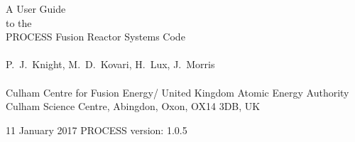 \documentclass[11pt,a4paper]{report}
\newcommand{\version}{
11 January 2017
\hfill
PROCESS version: 1.0.5
}
\begin{document}
\footnotesize
\hfill

\vspace*{4cm}
\begin{center}
\Huge A User Guide\\ to the \\ PROCESS Fusion Reactor Systems Code\\
~\\ \LARGE P.\ J.\ Knight, M.\ D.\ Kovari, H.\ Lux, J.\ Morris\\
~\\ \Large Culham Centre for Fusion Energy/ United Kingdom Atomic Energy Authority\\
Culham Science Centre, Abingdon, Oxon, OX14 3DB, UK
\end{center}

\vfill
\footnotesize
\version
\normalsize

\tableofcontents

\listoffigures

\listoftables



\end{document}
